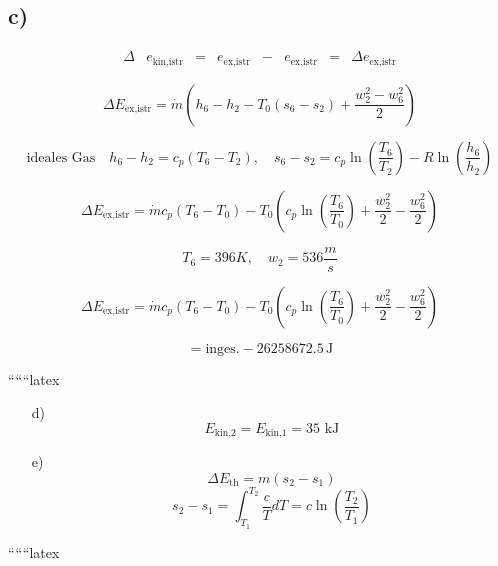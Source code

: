 \subsection*{c)}

\[
\begin{array}{cccccccc}
\Delta & e_{\text{kin,istr}} & = & e_{\text{ex,istr}} & - & e_{\text{ex,istr}} & = & \Delta e_{\text{ex,istr}}
\end{array}
\]

\[
\Delta E_{\text{ex,istr}} = \dot{m} (h_6 - h_2 - T_0 (s_6 - s_2) + \frac{w_2^2 - w_6^2}{2})
\]

\[
\text{ideales Gas} \quad h_6 - h_2 = c_p (T_6 - T_2), \quad s_6 - s_2 = c_p \ln \left( \frac{T_6}{T_2} \right) - R \ln \left( \frac{h_6}{h_2} \right)
\]

\[
\Delta E_{\text{ex,istr}} = \dot{m} c_p (T_6 - T_0) - T_0 \left( c_p \ln \left( \frac{T_6}{T_0} \right) + \frac{w_2^2}{2} - \frac{w_6^2}{2} \right)
\]

\[
T_6 = 396K, \quad w_2 = 536 \frac{m}{s}
\]

\[
\Delta E_{\text{ex,istr}} = \dot{m} c_p (T_6 - T_0) - T_0 \left( c_p \ln \left( \frac{T_6}{T_0} \right) + \frac{w_2^2}{2} - \frac{w_6^2}{2} \right)
\]

\[
= \text{inges.} - 26258672.5 \, \text{J}
\]

``````latex


\begin{itemize}
    \item[d)] 
    \[
    E_{\text{kin,2}} = E_{\text{kin,1}} = 35 \text{ kJ}
    \]
    
    \item[e)] 
    \[
    \Delta E_{\text{th}} = m (s_2 - s_1)
    \]
    \[
    s_2 - s_1 = \int_{T_1}^{T_2} \frac{c}{T} dT = c \ln \left( \frac{T_2}{T_1} \right)
    \]
    
\end{itemize}

``````latex


